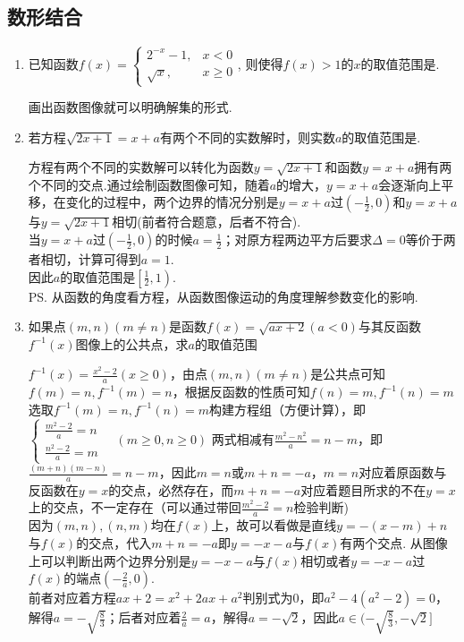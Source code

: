 \subsection*{数形结合}
\begin{enumerate}
    \item 已知函数$f(x)=\begin{cases}
    2^{-x}-1, & x < 0\\
    \sqrt{x}, & x\geq 0
    \end{cases}$, 
    则使得$f(x) > 1$的$x$的取值范围是. 
    \begin{jieda}
    画出函数图像就可以明确解集的形式.
    \end{jieda}
    \item 若方程$\sqrt{2x+1} = x+a$有两个不同的实数解时，则实数$a$的取值范围是\blkda{$\left[\frac{1}{2}, 1\right)$}.
    \begin{jieda}
        方程有两个不同的实数解可以转化为函数$y = \sqrt{2x+1}$和函数$y = x+a$拥有两个不同的交点.通过绘制函数图像可知，随着$a$的增大，$y = x+a$会逐渐向上平移，在变化的过程中，两个边界的情况分别是$y = x+a$过$(-\frac{1}{2}, 0)$和$y = x+a$与$y = \sqrt{2x+1}$相切(前者符合题意，后者不符合). \\
        当$y = x+a$过$(-\frac{1}{2}, 0)$的时候$a = \frac{1}{2}$；对原方程两边平方后要求$\Delta = 0$等价于两者相切，计算可得到$a = 1$. \\
        因此$a$的取值范围是$\left[\frac{1}{2}, 1\right)$. \\
        \ps 从函数的角度看方程，从函数图像运动的角度理解参数变化的影响.
    \end{jieda}
    \item 如果点$(m, n) (m \neq n)$是函数$f(x) = \sqrt{ax+2}(a < 0)$与其反函数$f^{-1}(x)$图像上的公共点，求$a$的取值范围
    \begin{jieda}
        $f^{-1}(x) = \frac{x^2-2}{a} (x \geq 0)$，由点$(m, n) (m \neq n)$是公共点可知$f(m) = n, f^{-1}(m) = n$，根据反函数的性质可知$f(n) = m, f^{-1}(n) = m$ \\
        选取$f^{-1}(m) = n, f^{-1}(n) = m$构建方程组（方便计算），即$\left \{ \begin{array}{ll}
             \frac{m^2-2}{a} = n  \\
             \frac{n^2-2}{a} = m
        \end{array}\right. \quad (m \geq 0, n \geq 0)$
        两式相减有$\frac{m^2-n^2}{a} = n-m$，即$\frac{(m+n)(m-n)}{a} = n-m$，因此$m = n$或$m+n = -a$，$m = n$对应着原函数与反函数在$y = x$的交点，必然存在，而$m+n = -a$对应着题目所求的不在$y = x$上的交点，不一定存在（可以通过带回$\frac{m^2-2}{a} = n$检验判断) \\
        因为$(m, n), (n, m)$均在$f(x)$上，故可以看做是直线$y = -(x-m)+n$与$f(x)$的交点，代入$m+n = -a$即$y = -x-a$与$f(x)$有两个交点. 从图像上可以判断出两个边界分别是$y = -x-a$与$f(x)$相切或者$y = -x-a$过$f(x)$的端点$(-\frac{2}{a}, 0)$. \\
        前者对应着方程$ax+2 = x^2+2ax+a^2$判别式为0，即$a^2-4(a^2-2)= 0$，解得$a = -\sqrt{\frac{8}{3}}$；后者对应着$\frac{2}{a} = a$，解得$a = -\sqrt{2}$，因此$a \in (-\sqrt{\frac{8}{3}}, -\sqrt{2}]$
    \end{jieda}
    

\end{enumerate}
